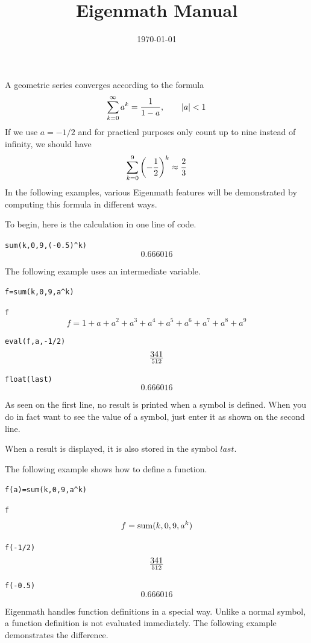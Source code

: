 \documentclass[11pt]{article}
\title{Eigenmath Manual}
\date{\today}
\begin{document}
\maketitle

\newpage



\newpage







\newpage

\noindent
A geometric series converges according to the formula
$$\sum_{k=0}^\infty a^k={1\over1-a},\qquad|a|<1$$
If we use $a=-1/2$ and for practical purposes only count up to nine instead of infinity,
we should have
$$\sum_{k=0}^9\left(-{1\over2}\right)^k\approx{2\over3}$$
In the following examples, various Eigenmath features will be demonstrated
by computing this formula in different ways.

\medskip
\noindent
To begin, here is the calculation in one line of code.

\medskip
\verb$sum(k,0,9,(-0.5)^k)$
$$0.666016$$

\medskip
\noindent
The following example uses an intermediate variable.

\medskip
\verb$f=sum(k,0,9,a^k)$

\verb$f$
$$f=1+a+a^2+a^3+a^4+a^5+a^6+a^7+a^8+a^9$$

\verb$eval(f,a,-1/2)$
$$341\over512$$

\verb$float(last)$
$$0.666016$$

\medskip
\noindent
As seen on the first line, no result is printed when a symbol is defined.
When you do in fact want to see the value of a symbol,
just enter it as shown on the second line.

\medskip
\noindent
When a result is displayed, it is also stored in the symbol $last$.

\newpage

\noindent
The following example shows how to define a function.

\medskip
\verb$f(a)=sum(k,0,9,a^k)$

\verb$f$
$$f=\mathop{\rm sum}(k,0,9,a^k)$$

\verb$f(-1/2)$
$$341\over512$$

\verb$f(-0.5)$
$$0.666016$$

\medskip
\noindent
Eigenmath handles function definitions in a special way.
Unlike a normal symbol, a function definition is not evaluated immediately.
The following example demonstrates the difference.
\end{document}
